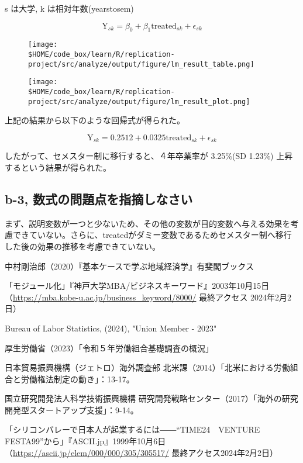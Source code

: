 \documentclass[a4paper]{jsarticle}
\begin{document}
s は大学, k は相対年数(yearstosem)

\begin{displaymath}
  \text{Y}_{sk} = \beta_0 + \beta_1 \text{treated}_{sk}  + \epsilon_{sk}
\end{displaymath}


\begin{figure}[H]
  \centering
  \texttt{[image: \\\$HOME/code\_box/learn/R/replication-project/src/analyze/output/figure/lm\_result\_table.png]}

\end{figure}

\begin{figure}[H]
  \centering
  \texttt{[image: \\\$HOME/code\_box/learn/R/replication-project/src/analyze/output/figure/lm\_result\_plot.png]}

\end{figure}

上記の結果から以下のような回帰式が得られた。

\begin{displaymath}
  \text{Y}_{sk} = 0.2512 + 0.0325 \text{treated}_{sk}  + \epsilon_{sk}
\end{displaymath}

したがって、セメスター制に移行すると、４年卒業率が 3.25\%(SD 1.23\%) 上昇するという結果が得られた。

\subsection*{b-3, 数式の問題点を指摘しなさい}

まず、説明変数が一つと少ないため、その他の変数が目的変数へ与える効果を考慮できていない。さらに、treatedがダミー変数であるためセメスター制へ移行した後の効果の推移を考慮できていない。


\begin{thebibliography}{9}
  中村剛治郎（2020）『基本ケースで学ぶ地域経済学』有斐閣ブックス

  「モジュール化」『神戸大学MBA/ビジネスキーワード』2003年10月15日（\url{https://mba.kobe-u.ac.jp/business_keyword/8000/} 最終アクセス 2024年2月2日）

  Bureau of Labor Statistics, (2024), "Union Member - 2023"

  厚生労働省（2023）「令和５年労働組合基礎調査の概況」

  日本貿易振興機構（ジェトロ）海外調査部 北米課（2014）「北米における労働組合と労働権法制定の動き」：13-17。

  国立研究開発法人科学技術振興機構 研究開発戦略センター（2017）「海外の研究開発型スタートアップ支援」：9-14。

  「シリコンバレーで日本人が起業するには――“TIME24　VENTURE　FESTA99”から」『ASCII.jp』1999年10月6日（\url{https://ascii.jp/elem/000/000/305/305517/} 最終アクセス2024年2月2日）
\end{thebibliography}
\end{document}
